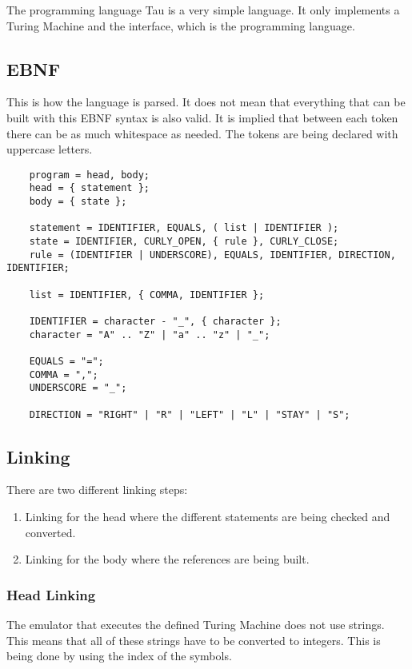 The programming language Tau is a very simple language. It only implements a Turing Machine and the interface, which is the programming language.

\subsection{EBNF}
This is how the language is parsed. It does not mean that everything that can be built with this EBNF syntax is also valid.
It is implied that between each token there can be as much whitespace as needed. 
The tokens are being declared with uppercase letters.

\begin{verbatim}
    program = head, body;
    head = { statement };
    body = { state };

    statement = IDENTIFIER, EQUALS, ( list | IDENTIFIER );
    state = IDENTIFIER, CURLY_OPEN, { rule }, CURLY_CLOSE;
    rule = (IDENTIFIER | UNDERSCORE), EQUALS, IDENTIFIER, DIRECTION, IDENTIFIER;

    list = IDENTIFIER, { COMMA, IDENTIFIER };

    IDENTIFIER = character - "_", { character };
    character = "A" .. "Z" | "a" .. "z" | "_";

    EQUALS = "=";
    COMMA = ",";
    UNDERSCORE = "_";

    DIRECTION = "RIGHT" | "R" | "LEFT" | "L" | "STAY" | "S";
\end{verbatim}

\subsection{Linking}
There are two different linking steps:
\begin{enumerate}
    \item Linking for the head where the different statements are being checked and converted.
    \item Linking for the body where the references are being built.
\end{enumerate}

\subsubsection{Head Linking}
The emulator that executes the defined Turing Machine does not use strings. 
This means that all of these strings have to be converted to integers. 
This is being done by using the index of the symbols.

